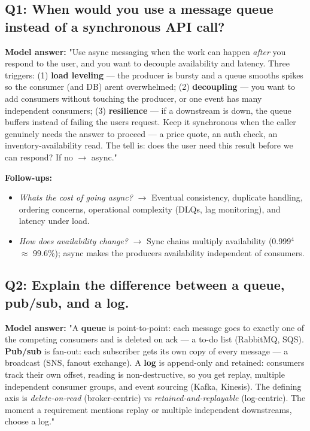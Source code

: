 \documentclass[11pt]{article}
\providecommand{\tightlist}{\setlength{\itemsep}{1pt}\setlength{\parskip}{0pt}}
\begin{document}
\subsection{Q1: When would you use a message queue instead of a synchronous API call?}\label{q1-when-would-you-use-a-message-queue-instead-of-a-synchronous-api-call}

\textbf{Model answer:} "Use async messaging when the work can happen \emph{after} you respond to the user, and you want to decouple availability and latency. Three triggers: (1) \textbf{load leveling} --- the producer is bursty and a queue smooths spikes so the consumer (and DB) aren\textquotesingle t overwhelmed; (2) \textbf{decoupling} --- you want to add consumers without touching the producer, or one event has many independent consumers; (3) \textbf{resilience} --- if a downstream is down, the queue buffers instead of failing the user\textquotesingle s request. Keep it synchronous when the caller genuinely needs the answer to proceed --- a price quote, an auth check, an inventory-availability read. The tell is: \textquotesingle does the user need this result before we can respond?\textquotesingle{} If no \(\rightarrow\) async."

\textbf{Follow-ups:}

\begin{itemize}
\tightlist
\item
  \emph{What\textquotesingle s the cost of going async?} \(\rightarrow\) Eventual consistency, duplicate handling, ordering concerns, operational complexity (DLQs, lag monitoring), and latency under load.
\item
  \emph{How does availability change?} \(\rightarrow\) Sync chains multiply availability (0.999\(^4\) \(\approx\) 99.6\%); async makes the producer\textquotesingle s availability independent of consumers.
\end{itemize}

\subsection{Q2: Explain the difference between a queue, pub/sub, and a log.}\label{q2-explain-the-difference-between-a-queue-pubsub-and-a-log}

\textbf{Model answer:} "A \textbf{queue} is point-to-point: each message goes to exactly one of the competing consumers and is deleted on ack --- a to-do list (RabbitMQ, SQS). \textbf{Pub/sub} is fan-out: each subscriber gets its own copy of every message --- a broadcast (SNS, fanout exchange). A \textbf{log} is append-only and retained: consumers track their own offset, reading is non-destructive, so you get replay, multiple independent consumer groups, and event sourcing (Kafka, Kinesis). The defining axis is \emph{delete-on-read} (broker-centric) vs \emph{retained-and-replayable} (log-centric). The moment a requirement mentions replay or multiple independent downstreams, choose a log."
\end{document}
